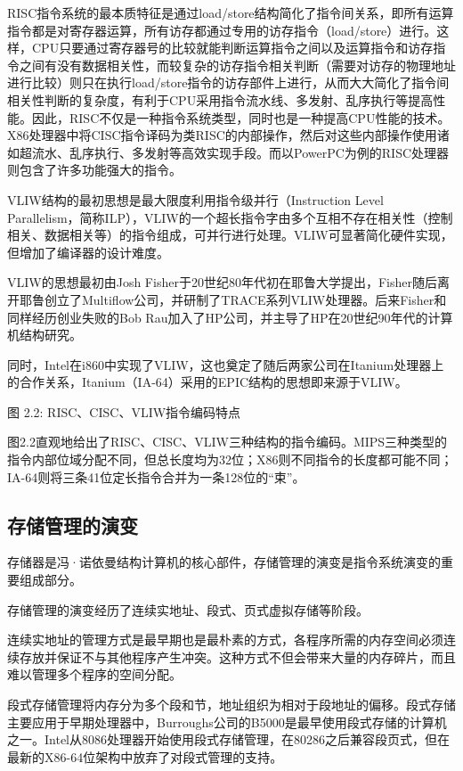 \documentclass[]{ctexbook}
\begin{document}
RISC指令系统的最本质特征是通过load/store结构简化了指令间关系，即所有运算指令都是对寄存器运算，所有访存都通过专用的访存指令（load/store）进行。这样，CPU只要通过寄存器号的比较就能判断运算指令之间以及运算指令和访存指令之间有没有数据相关性，而较复杂的访存指令相关判断（需要对访存的物理地址进行比较）则只在执行load/store指令的访存部件上进行，从而大大简化了指令间相关性判断的复杂度，有利于CPU采用指令流水线、多发射、乱序执行等提高性能。因此，RISC不仅是一种指令系统类型，同时也是一种提高CPU性能的技术。X86处理器中将CISC指令译码为类RISC的内部操作，然后对这些内部操作使用诸如超流水、乱序执行、多发射等高效实现手段。而以PowerPC为例的RISC处理器则包含了许多功能强大的指令。

VLIW结构的最初思想是最大限度利用指令级并行（Instruction Level Parallelism，简称ILP），VLIW的一个超长指令字由多个互相不存在相关性（控制相关、数据相关等）的指令组成，可并行进行处理。VLIW可显著简化硬件实现，但增加了编译器的设计难度。

VLIW的思想最初由Josh Fisher于20世纪80年代初在耶鲁大学提出，Fisher随后离开耶鲁创立了Multiflow公司，并研制了TRACE系列VLIW处理器。后来Fisher和同样经历创业失败的Bob Rau加入了HP公司，并主导了HP在20世纪90年代的计算机结构研究。

同时，Intel在i860中实现了VLIW，这也奠定了随后两家公司在Itanium处理器上的合作关系，Itanium（IA-64）采用的EPIC结构的思想即来源于VLIW。

图 2.2: RISC、CISC、VLIW指令编码特点

图2.2直观地给出了RISC、CISC、VLIW三种结构的指令编码。MIPS三种类型的指令内部位域分配不同，但总长度均为32位；X86则不同指令的长度都可能不同；IA-64则将三条41位定长指令合并为一条128位的``束''。

\hypertarget{ux5b58ux50a8ux7ba1ux7406ux7684ux6f14ux53d8}{%
\subsection{存储管理的演变}\label{ux5b58ux50a8ux7ba1ux7406ux7684ux6f14ux53d8}}

存储器是冯·诺依曼结构计算机的核心部件，存储管理的演变是指令系统演变的重要组成部分。

存储管理的演变经历了连续实地址、段式、页式虚拟存储等阶段。

连续实地址的管理方式是最早期也是最朴素的方式，各程序所需的内存空间必须连续存放并保证不与其他程序产生冲突。这种方式不但会带来大量的内存碎片，而且难以管理多个程序的空间分配。

段式存储管理将内存分为多个段和节，地址组织为相对于段地址的偏移。段式存储主要应用于早期处理器中，Burroughs公司的B5000是最早使用段式存储的计算机之一。Intel从8086处理器开始使用段式存储管理，在80286之后兼容段页式，但在最新的X86-64位架构中放弃了对段式管理的支持。
\end{document}
